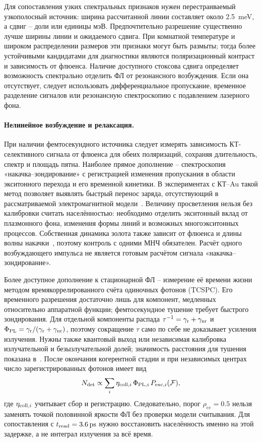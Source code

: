 Для сопоставления узких спектральных признаков нужен перестраиваемый
узкополосный источник: ширина рассчитанной линии составляет около
\SI{2.5}{\milli\electronvolt}, а сдвиг -- доли или единицы мэВ.
Предпочтительно разрешение существенно лучше ширины линии и ожидаемого
сдвига. При комнатной температуре и широком распределении размеров
эти признаки могут быть размыты; тогда более устойчивыми кандидатами
для диагностики являются поляризационный контраст и зависимость
от флюенса. Наличие доступного стоксова сдвига определяет возможность
спектрально отделить ФЛ от резонансного возбуждения. Если она отсутствует,
следует использовать дифференциальное пропускание, временное разделение
сигналов или резонансную спектроскопию с подавлением лазерного фона.

\paragraph{Нелинейное возбуждение и релаксация.}
При наличии фемтосекундного источника следует измерять зависимость
КТ-селективного сигнала от флюенса для обеих поляризаций, сохраняя
длительность, спектр и площадь пятна. Наиболее прямое дополнение --
спектроскопия «накачка--зондирование» с регистрацией изменения пропускания
в области экситонного перехода и его временной кинетики. В экспериментах
с КТ--Au такой метод позволяет выявлять быстрый перенос заряда,
отсутствующий в рассматриваемой электромагнитной модели~\cite{okuhata2020}.
Величину просветления нельзя без калибровки считать населённостью:
необходимо отделить экситонный вклад от плазмонного фона, изменения формы
линий и возможных многоэкситонных процессов. Собственная динамика золота
также зависит от флюенса и длины волны накачки~\cite{yu2011}, поэтому
контроль с одними МНЧ обязателен. Расчёт одного возбуждающего импульса
не является готовым расчётом сигнала «накачка--зондирование».

Более доступное дополнение к стационарной ФЛ -- измерение её времени
жизни методом времякоррелированного счёта одиночных фотонов (TCSPC).
Его временного разрешения достаточно лишь для компонент, медленных
относительно аппаратной функции; фемтосекундное тушение требует
быстрого зондирования. Для отдельной компоненты распада
$\tau^{-1}=\gamma_{\rm r}+\gamma_{\rm nr}$ и
$\Phi_{\rm PL}=\gamma_{\rm r}/(\gamma_{\rm r}+\gamma_{\rm nr})$,
поэтому сокращение $\tau$ само по себе не доказывает усиления излучения.
Нужны также квантовый выход или независимая калибровка излучательной
и безызлучательной долей; значимость расстояния для тушения показана
в~\cite{pons2007}. После окончания когерентной стадии и при независимых
центрах число зарегистрированных фотонов имеет вид
\begin{equation}
  N_{\rm det}\propto
  \sum_i \eta_{{\rm coll},i}\,\Phi_{{\rm PL},i}\,
  P_{{\rm exc},i}(\mathcal F),
  \label{eq:pl-readout}
\end{equation}
где $\eta_{{\rm coll},i}$ учитывает сбор и регистрацию.
Следовательно, порог $\rho_{ee}=0.5$ нельзя заменять точкой половинной
яркости ФЛ без проверки модели считывания. Для сопоставления с
$t_{\rm read}=\SI{3.6}{\pico\second}$ нужно восстановить населённость
именно на этой задержке, а не интеграл излучения за всё время.

